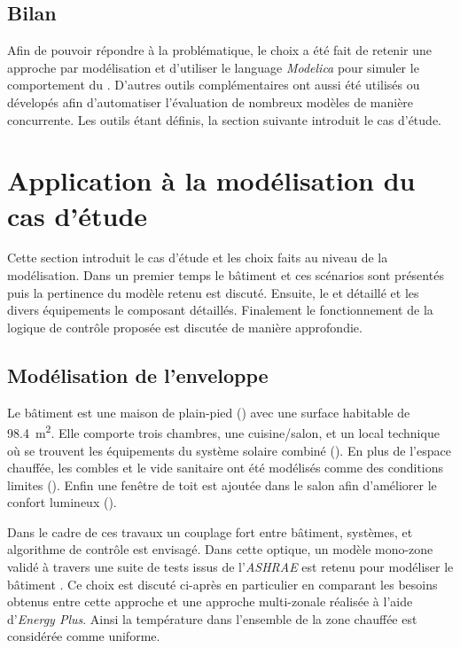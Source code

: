 \subsection{Bilan} %
\label{sub:bilan}
Afin de pouvoir répondre à la problématique, le choix a été fait de retenir une approche
par modélisation et d’utiliser le language \textit{Modelica} pour simuler le comportement
du . D’autres outils complémentaires ont aussi été utilisés ou dévelopés afin
d’automatiser l’évaluation de nombreux modèles de manière concurrente. Les outils étant
définis, la section suivante introduit le cas d’étude.



\section{Application à la modélisation du cas d’étude} %
\label{sec:application_a_la_modelisation_du_cas_d_etude}
Cette section introduit le cas d’étude et les choix faits au niveau de la modélisation.
Dans un premier temps le bâtiment et ces scénarios sont présentés puis la pertinence
du modèle retenu est discuté. Ensuite, le  et détaillé et les divers équipements
le composant détaillés. Finalement le fonctionnement de la logique de contrôle proposée
est discutée de manière approfondie.


\subsection{Modélisation de l’enveloppe} %
\label{sub:modelisation_de_l_enveloppe}
Le bâtiment est une maison de plain-pied () avec une surface habitable
de \SI{98.4}{\meter\squared}. Elle comporte trois chambres, une cuisine/salon, et un local
technique où se trouvent les équipements du système solaire combiné (). En plus de
l’espace chauffée, les combles et le vide sanitaire ont été modélisés comme des conditions
limites (). Enfin une fenêtre de toit est ajoutée dans
le salon afin d’améliorer le confort lumineux ().

Dans le cadre de ces travaux un couplage fort entre bâtiment, systèmes, et algorithme de
contrôle est envisagé. Dans cette optique, un modèle mono-zone validé à travers une suite
de tests issus de l’\textit{ASHRAE} est retenu pour modéliser le bâtiment
\parencite{Wetter2011,Nouidui2012}. Ce choix est discuté ci-après en particulier en
comparant les besoins obtenus entre cette approche et une approche multi-zonale réalisée
à l’aide d’\textit{Energy Plus}. Ainsi la température dans l’ensemble de la zone chauffée
est considérée comme uniforme.

